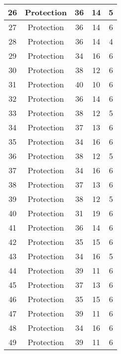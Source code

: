 \documentclass[results.tex]{subfiles}
\begin{document}
\begin{center}
\begin{tabular}{| c || c | c | c | c |}
    \hline
    26 & Protection & 36 & 14 & 5 \\ 
    \hline
    27 & Protection & 36 & 14 & 6 \\ 
    \hline
    28 & Protection & 36 & 14 & 4 \\ 
    \hline
    29 & Protection & 34 & 16 & 6 \\ 
    \hline
    30 & Protection & 38 & 12 & 6 \\ 
    \hline
    31 & Protection & 40 & 10 & 6 \\ 
    \hline
    32 & Protection & 36 & 14 & 6 \\ 
    \hline
    33 & Protection & 38 & 12 & 5 \\ 
    \hline
    34 & Protection & 37 & 13 & 6 \\ 
    \hline
    35 & Protection & 34 & 16 & 6 \\ 
    \hline
    36 & Protection & 38 & 12 & 5 \\ 
    \hline
    37 & Protection & 34 & 16 & 6 \\ 
    \hline
    38 & Protection & 37 & 13 & 6 \\ 
    \hline
    39 & Protection & 38 & 12 & 5 \\ 
    \hline
    40 & Protection & 31 & 19 & 6 \\ 
    \hline
    41 & Protection & 36 & 14 & 6 \\ 
    \hline
    42 & Protection & 35 & 15 & 6 \\ 
    \hline
    43 & Protection & 34 & 16 & 5 \\ 
    \hline
    44 & Protection & 39 & 11 & 6 \\ 
    \hline
    45 & Protection & 37 & 13 & 6 \\ 
    \hline
    46 & Protection & 35 & 15 & 6 \\ 
    \hline
    47 & Protection & 39 & 11 & 6 \\ 
    \hline
    48 & Protection & 34 & 16 & 6 \\ 
    \hline
    49 & Protection & 39 & 11 & 6 \\ 
    \hline   \end{tabular}
\end{center}
\end{document}
